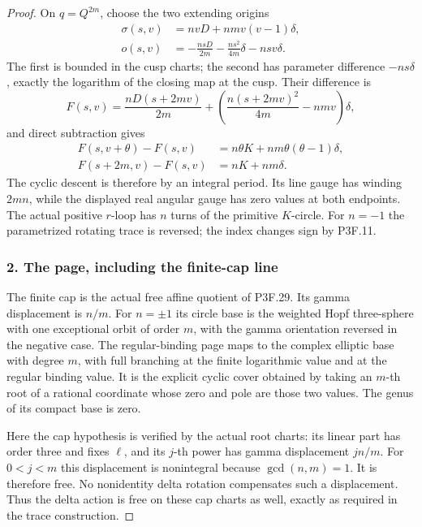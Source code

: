 \begin{proof}
On \(q=Q^{2m}\), choose the two extending origins \[
 \begin{aligned}
 \sigma(s,v)&=nvD+nmv(v-1)\delta,\\
 o(s,v)&=-\frac{nsD}{2m}
          -\frac{ns^2}{4m}\delta-nsv\delta.
 \end{aligned}
\] The first is bounded in the cusp charts; the second has parameter difference \(-ns\delta\), exactly the logarithm of the closing map at the cusp. Their difference is \[
 F(s,v)=\frac{nD(s+2mv)}{2m}
       +\left(\frac{n(s+2mv)^2}{4m}-nmv\right)\delta,
\] and direct subtraction gives \[
 \begin{aligned}
 F(s,v+\theta)-F(s,v)
    &=n\theta K+nm\theta(\theta-1)\delta,\\
 F(s+2m,v)-F(s,v)&=nK+nm\delta.
 \end{aligned}
\] The cyclic descent is therefore by an integral period. Its line gauge has winding \(2mn\), while the displayed real angular gauge has zero values at both endpoints. The actual positive \(r\)-loop has \(n\) turns of the primitive \(K\)-circle. For \(n=-1\) the parametrized rotating trace is reversed; the index changes sign by P3F.11.

\subsubsection{2. The page, including the finite-cap line}\label{the-page-including-the-finite-cap-line}

The finite cap is the actual free affine quotient of P3F.29. Its gamma displacement is \(n/m\). For \(n=\pm1\) its circle base is the weighted Hopf three-sphere with one exceptional orbit of order \(m\), with the gamma orientation reversed in the negative case. The regular-binding page maps to the complex elliptic base with degree \(m\), with full branching at the finite logarithmic value and at the regular binding value. It is the explicit cyclic cover obtained by taking an \(m\)-th root of a rational coordinate whose zero and pole are those two values. The genus of its compact base is zero.

Here the cap hypothesis is verified by the actual root charts: its linear part has order three and fixes \(\ell\), and its \(j\)-th power has gamma displacement \(jn/m\). For \(0<j<m\) this displacement is nonintegral because \(\gcd(n,m)=1\). It is therefore free. No nonidentity delta rotation compensates such a displacement. Thus the delta action is free on these cap charts as well, exactly as required in the trace construction.


\end{proof}
